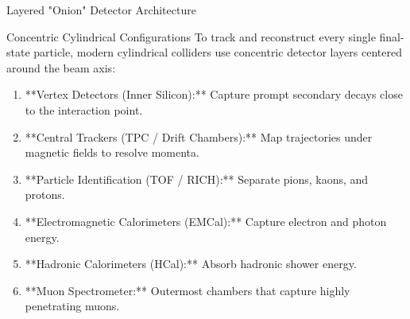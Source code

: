 \documentclass[aspectratio=169]{beamer}
\begin{document}
\begin{frame}{Layered "Onion" Detector Architecture}
    \begin{block}{Concentric Cylindrical Configurations}
        To track and reconstruct every single final-state particle, modern cylindrical colliders use concentric detector layers centered around the beam axis:
    \end{block}
    \begin{enumerate}
        \item **Vertex Detectors (Inner Silicon):** Capture prompt secondary decays close to the interaction point.
        \item **Central Trackers (TPC / Drift Chambers):** Map trajectories under magnetic fields to resolve momenta.
        \item **Particle Identification (TOF / RICH):** Separate pions, kaons, and protons.
        \item **Electromagnetic Calorimeters (EMCal):** Capture electron and photon energy.
        \item **Hadronic Calorimeters (HCal):** Absorb hadronic shower energy.
        \item **Muon Spectrometer:** Outermost chambers that capture highly penetrating muons.
    \end{enumerate}
\end{frame}
\end{document}
